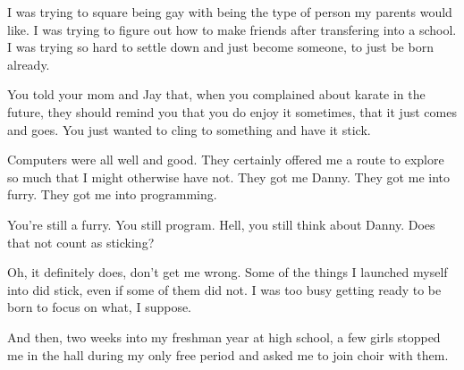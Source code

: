 \begin{paracol}{2}
\begin{leftcolumn}
I was trying to square being gay with being the type of person my parents would like. I was trying to figure out how to make friends after transfering into a school. I was trying so hard to settle down and just become someone, to just be born already.

\begin{ally}
You told your mom and Jay that, when you complained about karate in the future, they should remind you that you do enjoy it sometimes, that it just comes and goes. You just wanted to cling to something and have it stick.
\end{ally}
Computers were all well and good. They certainly offered me a route to explore so much that I might otherwise have not. They got me Danny. They got me into furry. They got me into programming.

\begin{ally}
You're still a furry. You still program. Hell, you still think about Danny. Does that not count as sticking?
\end{ally}
Oh, it definitely does, don't get me wrong. Some of the things I launched myself into did stick, even if some of them did not. I was too busy getting ready to be born to focus on what, I suppose.

And then, two weeks into my freshman year at high school, a few girls stopped me in the hall during my only free period and asked me to join choir with them.


\end{leftcolumn}
\end{paracol}
